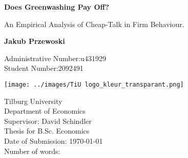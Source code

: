 \begin{titlepage}
    \begin{center}
        \vspace*{1cm}
 
        \Huge
        \textbf{Does Greenwashing Pay Off?}
 
        \vspace{0.5cm}
        An Empirical Analysis of Cheap-Talk in Firm Behaviour.
        
        \vspace{1.5cm}
        
        \textbf{Jakub Przewoski}
        
        \vspace{0.5cm}
        \Large
        Administrative Number:\@ u431929\\ 
        Student Number:\@ 2092491
        
        \vfill
        
        \texttt{[image: ../images/TiU logo\_kleur\_transparant.png]}
        
        \vspace{0.8cm}
        
        Tilburg University\\
        Department of Economics\\
        Supervisor: David Schindler\\
        Thesis for B.Sc. Economics \\
        Date of Submission: \today{} \\
        Number of words:

             
    \end{center}
\end{titlepage}
